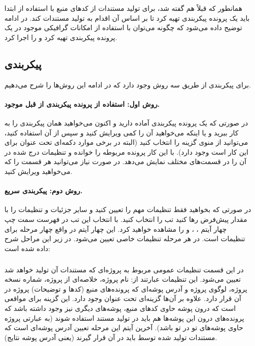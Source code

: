 همانطور که قبلاً هم گفته شد، برای تولید مستندات از کدهای منبع با استفاده از
 ابتدا باید یک پرونده پیکربندی تهیه کرد تا  بر اساس آن
اقدام به تولید مستندات کند. در ادامه توضیح داده می‌شود که چگونه می‌توان با
استفاده از امکانات گرافیکی موجود در  یک پرونده پیکربندی تهیه کرد
و  را اجرا کرد.

\subsection{پیکربندی}

برای پیکربندی  از طریق  سه روش وجود دارد که در ادامه
این روش‌ها را شرح می‌دهیم.

\paragraph{روش اول: استفاده از پرونده پیکربندی از قبل موجود.}
در صورتی که یک پرونده پیکربندی آماده دارید و اکنون می‌خواهید همان پیکربندی را به
کار ببرید و یا اینکه می‌خواهید آن را کمی ویرایش کنید و سپس از آن استفاده کنید،
می‌توانید از منوی  گزینه  را انتخاب کنید (البته در برخی موارد
دکمه‌ای تحت عنوان  برای این کار است وجود دارد). با این کار
 پرونده مربوطه را خوانده و تنظیمات درج شده در آن را در قسمت‌های
مختلف نمایش می‌دهد. در صورت نیاز می‌توانید هر قسمت را که می‌خواهید ویرایش کنید.

\paragraph{روش دوم: پیکربندی سریع.}
در صورتی که بخواهید فقط تنظیمات مهم را تعیین کنید و سایر جزئیات و تنظیمات را با
مقدار پیش‌فرض رها کنید تب  را انتخاب کنید. با انتخاب این تب در فهرست
سمت چپ چهار آیتم ، ،  و  را مشاهده
خواهید کرد. این چهار آیتم در واقع چهار مرحله برای تنظیمات است. در هر مرحله
تنظیمات خاصی تعیین می‌شود. در زیر این مراحل شرح داده شده است:

\subparagraph{}
در این قسمت تنظیمات عمومی مربوط به پروژه‌ای که مستندات آن تولید خواهد شد تعیین
می‌شود. این تنظیمات عبارتند از:
نام پروژه، خلاصه‌ای از پروژه، شماره نسخه پروژه، لوگوی پروژه و آدرس پوشه‌ای که
پرونده‌های منبع (کدها و توضیحات) پروژه در آن قرار دارد. علاوه بر آن‌ها گزینه‌ای
تحت عنوان  وجود دارد. این گزینه برای مواقعی است که درون
پوشه حاوی کدهای منبع، پوشه‌های دیگری نیز وجود داشته باشد که پرونده‌های درون این
پوشه‌ها هم باید در تولید مستند استفاده شوند (به عبارتی پروژه حاوی پوشه‌های تو در
تو باشد). آخرین آیتم این مرحله تعیین آدرس پوشه‌ای است که مستندات تولید شده توسط
 باید در آن قرار گیرند (یعنی آدرس پوشه نتایج).

